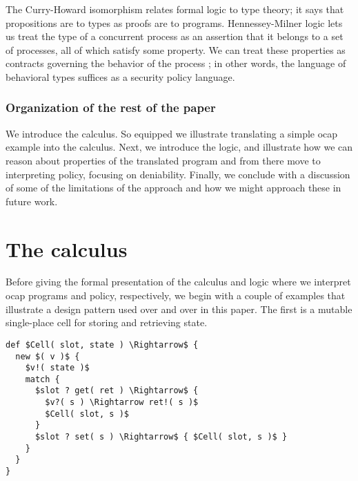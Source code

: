 \documentclass[]{amsart}
\theoremstyle{definition}
\theoremstyle{remark}
\numberwithin{equation}{subsection}
\begin{document}
The Curry-Howard isomorphism relates formal logic to type theory; it says 
that propositions are to types as proofs are to programs.  Hennessey-Milner
logic lets us treat the type of a concurrent process as an assertion that 
it belongs to a set of processes, all of which satisfy some property.  We
can treat these properties as contracts governing the behavior of the
process \cite{Meredith:2003:CT:944217.944236}; in other words, the 
language of behavioral types suffices as a security policy language.

\subsubsection{Organization of the rest of the paper}

We introduce the calculus. So equipped we illustrate translating a
simple ocap example into the calculus. Next, we introduce the logic,
and illustrate how we can reason about properties of the translated
program and from there move to interpreting policy, focusing on
deniability. Finally, we conclude with a discussion of some of the
limitations of the approach and how we might approach these in future
work.


\section{The calculus}

Before giving the formal presentation of the calculus and logic where
we interpret ocap programs and policy, respectively, we begin with a
couple of examples that illustrate a design pattern used over and over
in this paper. The first is a mutable single-place cell for storing
and retrieving state.


\begin{lstlisting}[mathescape]
def $Cell( slot, state ) \Rightarrow$ {
  new $( v )$ {
    $v!( state )$
    match {
      $slot ? get( ret ) \Rightarrow$ {
        $v?( s ) \Rightarrow ret!( s )$
        $Cell( slot, s )$
      }
      $slot ? set( s ) \Rightarrow$ { $Cell( slot, s )$ }
    }
  }
}
\end{lstlisting}
\end{document}
